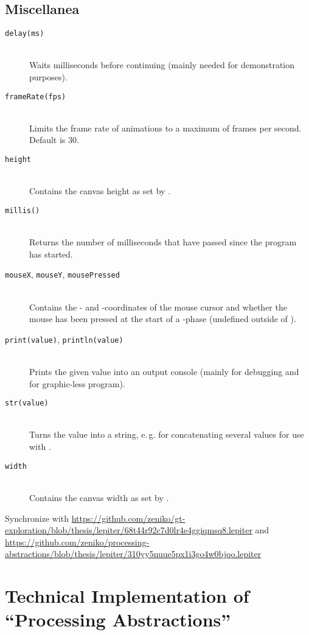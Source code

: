 \section{Miscellanea}
\begin{description}
\item[\texttt{delay(ms)}] \hfill \\
	Waits  milliseconds before continuing (mainly needed for demonstration purposes).
\item[\texttt{frameRate(fps)}] \hfill \\
	Limits the frame rate of animations to a maximum of  frames per second. Default is 30.
\item[\texttt{height}] \hfill \\
	Contains the canvas height as set by .
\item[\texttt{millis()}] \hfill \\
	Returns the number of milliseconds that have passed since the program has started.
\item[\texttt{mouseX}, \texttt{mouseY}, \texttt{mousePressed}] \hfill \\
	Contains the - and -coordinates of the mouse cursor and whether the mouse has been pressed at the start of a -phase (undefined outside of ).
\item[\texttt{print(value)}, \texttt{println(value)}] \hfill \\
	Prints the given value into an output console (mainly for debugging and for graphic-less program).
\item[\texttt{str(value)}] \hfill \\
	Turns the value into a string, e.\,g. for concatenating several values for use with .
\item[\texttt{width}] \hfill \\
	Contains the canvas width as set by .
\end{description}

\begin{todo}
\item Synchronize with \url{https://github.com/zeniko/gt-exploration/blob/thesis/lepiter/68t44r92c7d0lr4e4ggiqmsq8.lepiter} and \url{https://github.com/zeniko/processing-abstractions/blob/thesis/lepiter/310yy5nuue5px1i3go4w0bjqo.lepiter}
\end{todo}




\chapter{Technical Implementation of ``Processing Abstractions''} \label{app_implementation}
